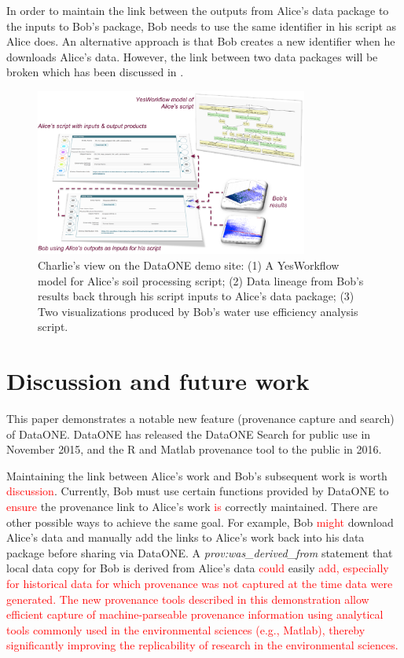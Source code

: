 \documentclass[a4paper]{llncs}
\begin{document}
In order to maintain the link between the outputs from Alice's data package to the inputs to Bob's package, Bob needs to use the same identifier in his script as Alice does. An alternative approach is that Bob creates a new identifier when he downloads Alice's data. However, the link between two data packages will be broken which has been discussed in \cite{missing-link}.  

\begin{figure}[t]
\centering   
\includegraphics[width=0.8\textwidth]{figs/abc-crop}
\caption{Charlie's view on the DataONE demo site: (1) A YesWorkflow model for Alice's soil processing script; (2) Data lineage from Bob's results back through his script inputs to Alice's data package; (3) Two visualizations produced by Bob's water use efficiency analysis script.}
\label{fig2}
\end{figure}


\section{Discussion and future work}

This paper demonstrates a notable new feature (provenance capture and search) of DataONE. DataONE has released the DataONE Search for public use in November 2015, and the R and Matlab provenance tool to the public in 2016. 

Maintaining the link between Alice's work and Bob's subsequent work is worth \textcolor{red}{discussion}. Currently, Bob must use certain functions provided by DataONE to \textcolor{red}{ensure} the provenance link to Alice's work \textcolor{red}{is} correctly maintained. There are other possible ways to achieve the same goal. For example,  Bob \textcolor{red}{might} download Alice's data and manually add the links to Alice's work back into his data package before sharing via DataONE. A \emph{prov:was\_derived\_from} statement that local data copy for Bob is derived from Alice's data \textcolor{red}{could} easily \textcolor{red}{add, especially for historical data for which provenance was not captured at the time data were generated.  The new provenance tools described in this demonstration allow efficient capture of machine-parseable provenance information using analytical tools commonly used in the environmental sciences (e.g., Matlab), thereby significantly improving the replicability of research in the environmental sciences.}
\end{document}
